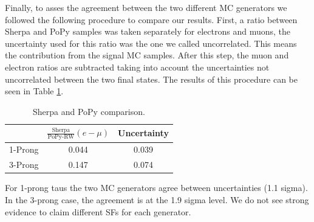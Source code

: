 Finally, to asses the agreement between the two different MC generators we followed the following procedure to compare our results. First, a ratio between Sherpa and PoPy samples was taken separately for electrons and muons, the uncertainty used for this ratio was the one we called uncorrelated. This means the contribution from the signal MC samples. After this step, the muon and electron ratios are subtracted taking into account the uncertainties not uncorrelated between the two final states. The results of this procedure can be seen in Table \ref{Tab10}.
\begin{table}[]
	\centering
	\begin{tabular}{|c|c|c|}
		\hline
		& $\frac{\text{Sherpa}}{\text{PoPy-RW}}(e-\mu)$ & Uncertainty \\ \hline
		1-Prong & 0.044                                         & 0.039       \\ \hline
		3-Prong & 0.147                                         & 0.074       \\ \hline
	\end{tabular}
	\caption{Sherpa and PoPy comparison.}
	\label{Tab10}
\end{table}		  
For 1-prong taus the two MC generators agree between uncertainties (1.1 sigma). In the 3-prong case, the agreement is at the 1.9 sigma level. We do not see strong evidence to claim different SFs for each generator.

